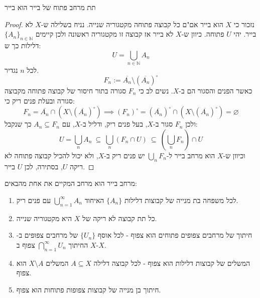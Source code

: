 \documentclass{tstextbook}
\begin{document}
\begin{proposition}
תת מרחב פתוח של בייר הוא בייר

\end{proposition}
\begin{proof}
נזכור כי \(X\) הוא בייר אם"ם כל קבוצה פתוחה מקטגוריה שנייה. נניח בשלילה ש-\(X\) לא בייר. יהי \(U\) פתוחה. כיוון ש-\(X\) לא בייר אז קבוצה זו מקטגוריה ראשונה ולכן קיימים \(\{ A_{n} \}_{n \in \mathbb{N}}\) דלילות כך ש:
$$U=\bigcup_{n \in \mathbb{N}} A_{n}$$
לכל \(n\) נגדיר.
$$F_{n}:= \overline{A_{n}} \setminus  \left( \overline{A_{n}}  \right)^{\circ }$$
כאשר הפנים והסגור הם ב-\(X\). נשים לב כי \(F_{n}\) סגורה בתור חיסור של קבוצה פתוחה מקבוצה סגורה ובעלת פנים ריק כי:
$$F_{n}=\overline{A_{n}} \cap\left( X\setminus \left( \overline{A_{n}}  \right)^{\circ } \right)\implies (F_{n})^{\circ }=\left( \overline{A_{n}}  \right)^{\circ }\cap\left( X\setminus \left( \overline{A_{n}} \right)^{\circ } \right)=\varnothing $$
ולכן \(F_{n}\) סגור ב-\(X\), בעל פנים ריק, ודליל ב-\(X\), עם \(A_{n}\subseteq F_{n}\) כך שנקבל:
$$U=\bigcup_{n}A_{n}\ \subseteq\ \bigcup_{n}(F_{n}\cap U)\ \subseteq\ \left(\bigcup_{n}F_{n}\right)\cap U$$
וכיוון ש-\(X\) הוא מרחב בייר ל-\(\bigcup_{n}F_{n}\) יש פנים ריק ב-\(X\), ולא יכול להכיל קבוצה פתוחה לא ריקה \(U\), בסתירה, לכן \(U\) בייר.

\end{proof}
\begin{summary}
מרחב בייר הוא מרחב המקיים את אחת מהבאים:

  \begin{enumerate}
    \item לכל משפחה בת מנייה של קבוצות דלילות \(\{ A_{n} \}\) האיחוד \(\bigcup_{n=1}^{\infty}A_{n}\) עם פנים ריק. 


    \item כל תת קבוצה לא ריקה של \(X\) היא מקטגוריה שנייה. 


    \item חיתוך של מרחבים צפופים פתוחים הוא צפוף - לכל אוסף \(\{ U_{n} \}\) של מרחבים צפופים ב-\(X\) החיתוך \(\bigcap_{n=1}^{\infty}U_{n}\) צפוף ב-\(X\). 


    \item המשלים של קבוצות דלילות הוא צפוף - לכל קבוצה דלילה \(A\subseteq X\) המשלים \(X \setminus A\) הוא צפוף. 


    \item חיתוך בן מנייה של קבוצות צפופות פתוחות הוא צפוף. 


  \end{enumerate}
\end{summary}
\end{document}
